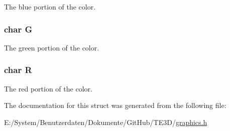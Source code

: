 The blue portion of the color. 

\hypertarget{struct_t_e3_d___color_a315a930253c84503674d7296f5868b9a}{
\subsubsection[{G}]{\setlength{\rightskip}{0pt plus 5cm}char G}}\label{struct_t_e3_d___color_a315a930253c84503674d7296f5868b9a}


The green portion of the color. 

\hypertarget{struct_t_e3_d___color_a4357ae277476a29fe6f60cfd3ccd798f}{
\subsubsection[{R}]{\setlength{\rightskip}{0pt plus 5cm}char R}}\label{struct_t_e3_d___color_a4357ae277476a29fe6f60cfd3ccd798f}


The red portion of the color. 



The documentation for this struct was generated from the following file\-:\begin{DoxyCompactItemize}
\item 
E\-:/\-System/\-Benutzerdaten/\-Dokumente/\-Git\-Hub/\-T\-E3\-D/\hyperlink{graphics_8h}{graphics.\-h}\end{DoxyCompactItemize}
